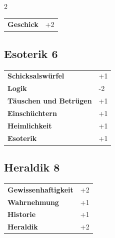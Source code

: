 \begin{multicols}{2}
\begin{tcolorbox}
\begin{tabular}{@{}ll@{}}
    \textbf{Geschick} & +2\\
\end{tabular}


\end{tcolorbox}

\begin{tcolorbox}
    \subsection*{Esoterik \hfill \small{6 }}
    \tcblower




\begin{tabular}{@{}ll@{}}
    \textbf{Schicksalswürfel} & +1\\
    \textbf{Logik} & -2\\
    \textbf{Täuschen und Betrügen} & +1\\
    \textbf{Einschüchtern} & +1\\
    \textbf{Heimlichkeit} & +1\\
    \textbf{Esoterik} & +1\\
\end{tabular}


\end{tcolorbox}

\begin{tcolorbox}
    \subsection*{Heraldik \hfill \small{8 }}
    \tcblower




\begin{tabular}{@{}ll@{}}
    \textbf{Gewissenhaftigkeit} & +2\\
    \textbf{Wahrnehmung} & +1\\
    \textbf{Historie} & +1\\
    \textbf{Heraldik} & +2\\
\end{tabular}


\end{tcolorbox}
\end{multicols}
